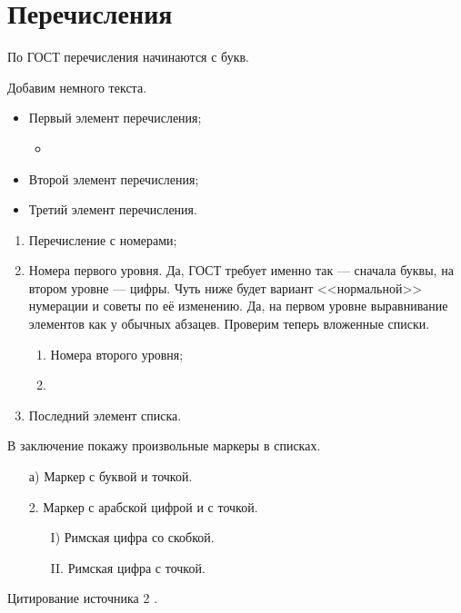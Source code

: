 \section{Перечисления}

По ГОСТ перечисления начинаются с букв.

Добавим немного текста. \lipsum[1][1]

\begin{itemize}
    \item Первый элемент перечисления;
    \begin{itemize}
        \item \lipsum[1][1]
    \end{itemize}
    \item Второй элемент перечисления;
    \item Третий элемент перечисления.
\end{itemize}

\lipsum[1][1]

\begin{enumerate}
    \item Перечисление с номерами;
    \item Номера первого уровня. Да, ГОСТ требует именно так --- сначала буквы, 
    на втором уровне --- цифры. Чуть ниже будет вариант <<нормальной>> 
    нумерации и советы по её изменению.
    Да, на первом уровне выравнивание элементов как у обычных абзацев. 
    Проверим теперь вложенные списки.
        \begin{enumerate}
            \item Номера второго уровня;
            \item \lipsum[1][1]
        \end{enumerate}
    \item Последний элемент списка.
\end{enumerate}

В заключение покажу произвольные маркеры в списках. 

\begin{enumerate}
    \item[а)] Маркер с буквой и точкой.
    \item[2.] Маркер с арабской цифрой и с точкой.
        \begin{enumerate}
            \item[I)] Римская цифра со скобкой.
            \item[II.] Римская цифра с точкой.
        \end{enumerate}
\end{enumerate}


Цитирование источника 2 \cite{Article3}.
